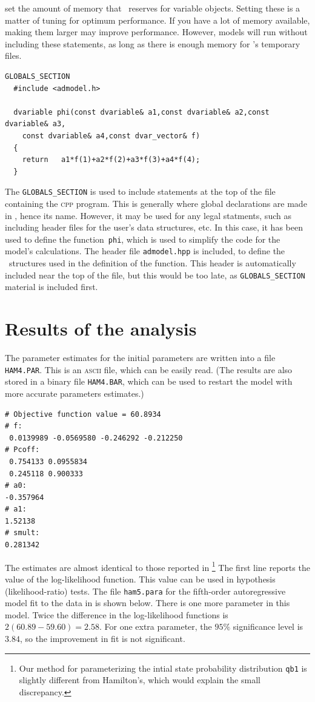\documentclass{admbmanual}
\begin{document}
set the amount of memory that \ADM\ reserves for variable objects.
Setting these is a matter of tuning for optimum performance. If you have 
a lot of memory available, making them larger may improve performance.
However, models will run without including these statements,
as long as there is enough memory for \ADM's temporary files. 
\begin{lstlisting}
GLOBALS_SECTION  
  #include <admodel.h>
  
  dvariable phi(const dvariable& a1,const dvariable& a2,const dvariable& a3,
    const dvariable& a4,const dvar_vector& f)
  {
    return   a1*f(1)+a2*f(2)+a3*f(3)+a4*f(4);
  }  
\end{lstlisting}
The \texttt{GLOBALS\_SECTION} is used to include statements at the top of the
file containing the \textsc{cpp} program. This is generally where global
declarations are made in \cplus, hence its name. However, it may be
used for any legal statments, such as including header files for
the user's data structures, etc. In this case, it has been used to
define the function~\texttt{phi}, which is used to simplify  the code
for the model's calculations. The header file \texttt{admodel.hpp} is
included, to define the \scAD\ structures used in the
definition of the function. This header is automatically included
near the top of the file,
but this would be too late, as \texttt{GLOBALS\_SECTION} material
is included first.


\section{Results of the analysis} 

The parameter estimates for the initial parameters are written into a file
\texttt{HAM4.PAR}. This is an \textsc{ascii} file, which can be easily read. (The results
are also stored in a binary file \texttt{HAM4.BAR}, which can be used to
restart the model with more accurate parameters estimates.)
\begin{lstlisting}
# Objective function value = 60.8934
# f:
 0.0139989 -0.0569580 -0.246292 -0.212250
# Pcoff:
 0.754133 0.0955834
 0.245118 0.900333
# a0:
-0.357964
# a1:
1.52138
# smult:
0.281342
\end{lstlisting}
The estimates are almost identical to those reported in 
\cite{hamilton1989}\footnote{Our method for parameterizing the 
intial state probability distribution \texttt{qb1} is slightly
different from Hamilton's, which would explain the small discrepancy.}
The first line reports the value of the log-likelihood function. This value can
be used in hypothesis (likelihood-ratio) tests.  
The file \texttt{ham5.para} for the fifth-order autoregressive model fit to
the data in \cite{hamilton1989} is shown below. There is one more parameter in
this model. Twice the difference in the log-likelihood functions is 
$2(60.89-59.60)=2.58$. For one extra parameter, the $95\%$
significance level is $3.84$, so the improvement in fit is not significant. 
\end{document}
